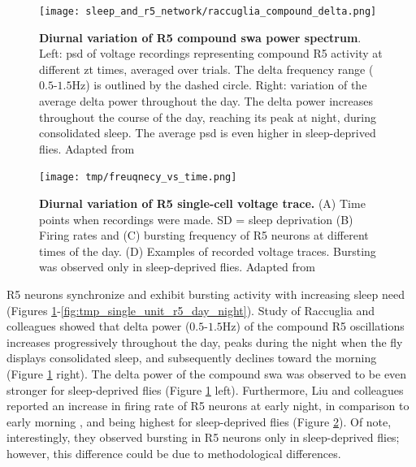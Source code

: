 \documentclass[../main.tex]{subfiles}
\begin{document}
\begin{figure}[!b]
    \centering
    \texttt{[image: sleep\_and\_r5\_network/raccuglia\_compound\_delta.png]}
    \caption[Diurnal variation of R5 compound \gls{swa} power spectrum]{
        \textbf{Diurnal variation of R5 compound \gls{swa} power spectrum}.
        Left: \gls{psd} of voltage recordings representing compound R5 activity at different \gls{zt} times, averaged over trials. The delta frequency range ($0.5$-$1.5$Hz) is outlined by the dashed circle. Right: variation of the average delta power throughout the day. The delta power increases throughout the course of the day, reaching its peak at night, during consolidated sleep. The average \gls{psd} is even higher in sleep-deprived flies.
        Adapted from \parencite{raccugliaNetworkSpecificSynchronizationElectrical2019}
    }
    \label{fig:raccuglia_compound_delta_oscillations}
\end{figure}

\begin{figure}[!b]
    \centering
    \texttt{[image: tmp/freuqnecy\_vs\_time.png]}
    \caption[Diurnal variation of R5 single-cell voltage trace.]{
        \textbf{Diurnal variation of R5 single-cell voltage trace.}
        (A) Time points when recordings were made. SD = sleep deprivation (B) Firing rates and (C) bursting frequency of R5 neurons at different times of the day. (D) Examples of recorded voltage traces. Bursting was observed only in sleep-deprived flies. Adapted from \parencite{liuSleepDriveEncoded2016}
    }
    \label{fig:tmp_frequency_vs_zt}
\end{figure}

R5 neurons synchronize and exhibit bursting activity with increasing sleep need \parencite{raccugliaNetworkSpecificSynchronizationElectrical2019,liuSleepDriveEncoded2016}
(Figures \ref{fig:raccuglia_compound_delta_oscillations}-\ref{fig:tmp_single_unit_r5_day_night}).
Study of Raccuglia and colleagues showed that delta power ($0.5$-$1.5$Hz) of the compound R5 oscillations increases progressively throughout the day, peaks during the night when the fly displays consolidated sleep, and subsequently declines toward the morning \parencite{raccugliaNetworkSpecificSynchronizationElectrical2019} (Figure \ref{fig:raccuglia_compound_delta_oscillations} right).
The delta power of the compound \gls{swa} was observed to be even stronger for sleep-deprived flies (Figure \ref{fig:raccuglia_compound_delta_oscillations} left). Furthermore, Liu and colleagues reported an increase in firing rate of R5 neurons at early night, in comparison to early morning \parencite{liuSleepDriveEncoded2016}, and being highest for sleep-deprived flies (Figure \ref{fig:tmp_frequency_vs_zt}). Of note, interestingly, they observed bursting in R5 neurons only in sleep-deprived flies; however, this difference could be due to methodological differences. 
\end{document}
